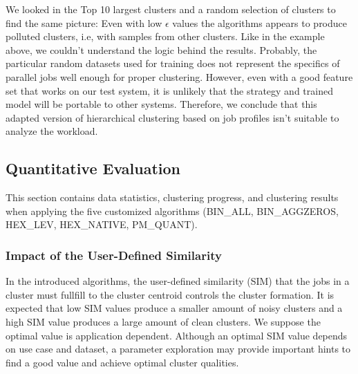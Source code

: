 \documentclass{jhps}
\begin{document}
We looked in the Top 10 largest clusters and a random selection of clusters to find the same picture:
Even with low $\epsilon$ values the algorithms appears to produce polluted clusters, i.e, with samples from other clusters.
Like in the example above, we couldn't understand the logic behind the results.
Probably, the particular random datasets used for training does not represent the specifics of parallel jobs  well enough for proper clustering.
However, even with a good feature set that works on our test system, it is unlikely that the strategy and trained model will be portable to other systems.
Therefore, we conclude that this adapted version of hierarchical clustering based on job profiles isn't suitable to analyze the workload.

\subsection{Quantitative Evaluation}
This section contains data statistics, clustering progress, and clustering results when applying the five customized algorithms (BIN\_ALL, BIN\_AGGZEROS, HEX\_LEV, HEX\_NATIVE, PM\_QUANT).


\subsubsection{Impact of the User-Defined Similarity}
In the introduced algorithms, the user-defined similarity (SIM) that the jobs in a cluster must fullfill to the cluster centroid controls the cluster formation.
It is expected that low SIM values produce a smaller amount of noisy clusters and a high SIM value produces a large amount of clean clusters.
We suppose the optimal value is application dependent.
Although an optimal SIM value depends on use case and dataset, a parameter exploration may provide important hints to find a good value and achieve optimal cluster qualities.
\end{document}
